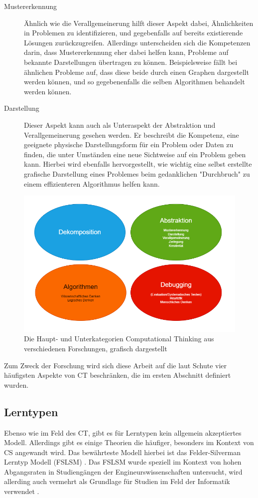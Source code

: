 \begin{description}
    \item[Mustererkennung] Ähnlich wie die Verallgemeinerung hilft dieser Aspekt dabei, Ähnlichkeiten in Problemen zu identifizieren, und gegebenfalls auf bereits existierende Lösungen zurückzugreifen. Allerdings unterscheiden sich die Kompetenzen darin, dass Mustererkennung eher dabei helfen kann, Probleme auf bekannte Darstellungen übertragen zu können. Beispielsweise fällt bei ähnlichen Probleme auf, dass diese beide durch einen Graphen dargestellt werden können, und so gegebenenfalls die selben Algorithmen behandelt werden können.
    \item[Darstellung] Dieser Aspekt kann auch als Unteraspekt der Abstraktion und Verallgemeinerung gesehen werden. Er beschreibt die Kompetenz, eine geeignete physische Darstellungsform für ein Problem oder Daten zu finden, die unter Umständen eine neue Sichtweise auf ein Problem geben kann. Hierbei wird ebenfalls hervorgestellt, wie wichtig eine selbst erstellte grafische Darstellung eines Problemes beim gedanklichen "Durchbruch" zu einem effizienteren Algorithmus helfen kann.
\end{description}

\begin{figure}[h!]
    \centering
    \includegraphics[width=1\linewidth]{Figures/CT}
    \caption{Die Haupt- und Unterkategorien Computational Thinking aus verschiedenen Forschungen, grafisch dargestellt}
\end{figure}

Zum Zweck der Forschung wird sich diese Arbeit auf die laut Schute vier häufigsten Aspekte von CT beschränken, die im ersten Abschnitt definiert wurden.

\subsection{Lerntypen}
Ebenso wie im Feld des CT, gibt es für Lerntypen kein allgemein akzeptiertes Modell. Allerdings gibt es einige Theorien die häufiger, besonders im Kontext von CS angewandt wird. Das bewährteste Modell hierbei ist das Felder-Silverman Lerntyp Modell (FSLSM) \cite{felder}. 
Das FSLSM wurde speziell im Kontext von hohen Abgangsraten in Studiengängen der Engineurswissenschaften untersucht, wird allerding auch vermehrt als Grundlage für Studien im Feld der Informatik verwendet \cite{kumar}.

